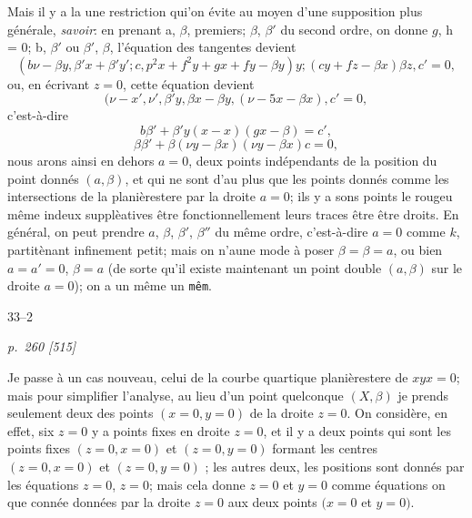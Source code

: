 \documentclass[11pt,a4paper]{book}
\begin{document}
Mais il y a la une restriction qui'on \'evite au moyen d'une supposition plus g\'en\'erale,
\textit{savoir}: en prenant a, $\beta$, premiers; $\beta$, $\beta'$ du second ordre, on donne $g$, h = 0; b, $\beta'$ ou $\beta'$, $\beta$,
l'\'equation des tangentes devient
\[
(b\nu - \beta y, \beta' x + \beta' y'; c, p^2x + f^2y + gx + fy - \beta y)y; (cy + fz - \beta x)\beta z, c' = 0,
\]
ou, en \'ecrivant $z = 0$, cette \'equation devient
\[
(\nu - x', \nu', \beta' y, \beta x - \beta y, (\nu - 5x - \beta x), c' = 0,
\]
c'est-\`a-dire
\[
b\beta' + \beta' y(x - x)(gx - \beta) = c',
\]
\[
\beta\beta' + \beta(\nu y - \beta x)(\nu y - \beta x)c = 0,
\]
nous arons ainsi en dehors $a = 0$, deux points ind\'ependants de la position du point
donn\'es $(a, \beta)$, et qui ne sont d'au plus que les points donn\'es comme les intersections de la
plani\`erestere par la droite $a = 0$; ils y a sons points le rougeu m\^eme indeux suppl\`eatives
\^etre fonctionnellement leurs traces \^etre \^etre droits.  En g\'en\'eral, on peut prendre $a$, $\beta$, $\beta'$, $\beta''$ du m\^eme ordre, c'est-\`a-dire
$a = 0$ comme $k$, partit\`enant infinement petit; mais on n'aune mode \`a poser $\beta = \beta = a$, ou bien $a = a' = 0$, $\beta = a$ (de sorte qu'il
existe maintenant un point double $(a, \beta)$ sur le droite $a = 0$); on a un m\^eme un \texttt{m\^em}.

\hfill 33--2

\clearpage

\bigskip
\textit{p.~260 [515]}
\smallskip

Je passe \`a un cas nouveau, celui de la courbe quartique plani\`erestere de $xyx = 0$;
mais pour simplifier l'analyse, au lieu d'un point quelconque $(X, \beta)$ je prends seulement deux des points $(x = 0, y = 0)$ de la droite $z = 0$.  On consid\`ere, en effet, six $z = 0$
y a points fixes en droite $z = 0$, et il y a deux points qui sont les points fixes $(z = 0, x = 0)$ et
$(z = 0, y = 0)$ formant les centres $(z = 0, x = 0)$ et $(z = 0, y = 0)$ ; les autres deux, les positions
sont donn\'es par les \'equations $z = 0$, $z = 0$; mais cela donne $z = 0$ et $y = 0$ comme \'equations
on que conn\'ee donn\'ees par la droite $z = 0$ aux deux points $(x = 0$ et $y = 0)$.
\end{document}
